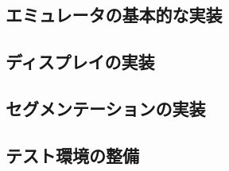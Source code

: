 \documentclass[10pt,a4j]{jsarticle}
\begin{document}
\subsection{エミュレータの基本的な実装}

\subsection{ディスプレイの実装}

\subsection{セグメンテーションの実装}

\subsection{テスト環境の整備}





\end{document}
